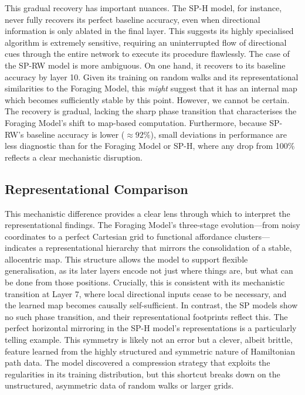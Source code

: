 This gradual recovery has important nuances. The SP-H model, for instance, never fully recovers its perfect baseline accuracy, even when directional information is only ablated in the final layer. This suggests its highly specialised algorithm is extremely sensitive, requiring an uninterrupted flow of directional cues through the entire network to execute its procedure flawlessly. The case of the SP-RW model is more ambiguous. On one hand, it recovers to its baseline accuracy by layer 10. Given its training on random walks and its representational similarities to the Foraging Model, this \textit{might} suggest that it has an internal map which becomes sufficiently stable by this point. However, we cannot be certain. The recovery is gradual, lacking the sharp phase transition that characterises the Foraging Model's shift to map-based computation. Furthermore, because SP-RW’s baseline accuracy is lower ($\approx92\%$), small deviations in performance are less diagnostic than for the Foraging Model or SP-H, where any drop from 100\% reflects a clear mechanistic disruption.


\subsection{Representational Comparison}
This mechanistic difference provides a clear lens through which to interpret the representational findings. The Foraging Model’s three-stage evolution—from noisy coordinates to a perfect Cartesian grid to functional affordance clusters—indicates a representational hierarchy that mirrors the consolidation of a stable, allocentric map. This structure allows the model to support flexible generalisation, as its later layers encode not just where things are, but what can be done from those positions. Crucially, this is consistent with its mechanistic transition at Layer 7, where local directional inputs cease to be necessary, and the learned map becomes causally self-sufficient. In contrast, the SP models show no such phase transition, and their representational footprints reflect this. The perfect horizontal mirroring in the SP-H model's representations is a particularly telling example. This symmetry is likely not an error but a clever, albeit brittle, feature learned from the highly structured and symmetric nature of Hamiltonian path data. The model discovered a compression strategy that exploits the regularities in its training distribution, but this shortcut breaks down on the unstructured, asymmetric data of random walks or larger grids. 

